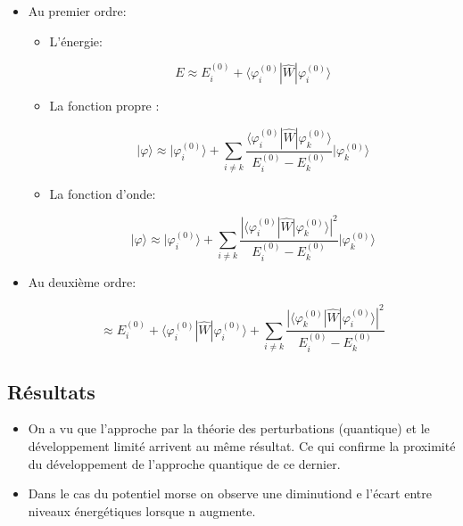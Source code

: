 \begin{itemize}[label=]

	\item Au premier ordre:

	\begin{itemize}[label=]

		\item L'énergie:

		\[
			E \approx E_i^{(0)} + \langle \varphi_i^{(0)} | \hat{W} |\varphi_i^{(0)} \rangle
		\]

		\item La fonction propre :

		\[
			| \varphi \rangle \approx
			| \varphi_i^{(0)} \rangle +
			\sum_{i\neq k}\frac{\langle \varphi_i^{(0)} | \hat{W} |\varphi_k^{(0)} \rangle}{E_i^{(0)}-E_k^{(0)}}
			| \varphi_k^{(0)}\rangle 
		\]

		\item La fonction d'onde:

		\[
			| \varphi \rangle \approx
			| \varphi_i^{(0)} \rangle +
			\sum_{i\neq k}\frac{|\langle \varphi_i^{(0)} | \hat{W} |\varphi_k^{(0)} \rangle|^2}{E_i^{(0)}-E_k^{(0)}}
			| \varphi_k^{(0)}\rangle
		\]

	\end{itemize}

	\item Au deuxième ordre:

	\[
		\approx E_i^{(0)} + \langle \varphi_i^{(0)} | \hat{W} |\varphi_i^{(0)} \rangle +\sum_{i\neq k}\frac{|\langle \varphi_k^{(0)} | \hat{W} |\varphi_i^{(0)} \rangle|^2}{E_i^{(0)}-E_k^{(0)}}
	\]

\end{itemize}


\subsection{Résultats}


\begin{itemize}[label=]

	\item On a vu que l'approche par la théorie des perturbations (quantique) et le développement limité arrivent au même résultat. Ce qui confirme la proximité du développement de l'approche quantique de ce dernier.

	\item Dans le cas du potentiel morse on observe une diminutiond e l'écart entre niveaux énergétiques lorsque n augmente.
	
\end{itemize}